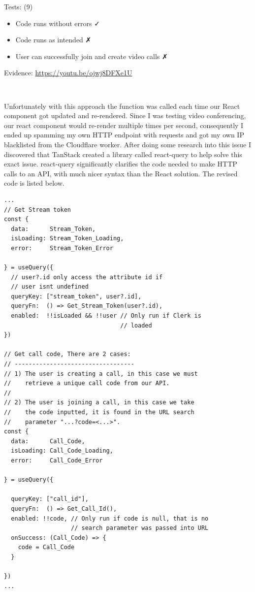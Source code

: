 {\sffamily Tests: (9)}

\begin{itemize}
  \item Code runs without errors \faCheck \\
  \item Code runs as intended \faClose \\
  \item User can successfully join and create video calls \faClose \\
\end{itemize}

{\sffamily Evidence:} \url{https://youtu.be/ojwj8DFXe1U}

{\color{gray} \hrulefill} \\ \vspace{0.2cm}

Unfortunately with this approach the 
function was called each time our React component got updated and
re-rendered. Since I was testing video conferencing, our react
component would re-render multiple times per second, consequently
I ended up spamming my own HTTP endpoint with requests and got
my own IP blacklisted from the Cloudflare worker. After doing
some research into this issue I discovered that TanStack
created a library called react-query to help solve this
exact issue. react-query significantly clarifies the code
needed to make HTTP calls to an API, with much nicer syntax
than the React  solution. The revised code is
listed below.

\begin{verbatim}
...
// Get Stream token
const {
  data:      Stream_Token,
  isLoading: Stream_Token_Loading,
  error:     Stream_Token_Error

} = useQuery({
  // user?.id only access the attribute id if
  // user isnt undefined
  queryKey: ["stream_token", user?.id],
  queryFn:  () => Get_Stream_Token(user?.id),
  enabled:  !!isLoaded && !!user // Only run if Clerk is
                                 // loaded
})

// Get call code, There are 2 cases:
// ----------------------------------
// 1) The user is creating a call, in this case we must
//    retrieve a unique call code from our API.
//
// 2) The user is joining a call, in this case we take
//    the code inputted, it is found in the URL search
//    parameter "...?code=<...>".
const {
  data:      Call_Code,
  isLoading: Call_Code_Loading,
  error:     Call_Code_Error

} = useQuery({

  queryKey: ["call_id"],
  queryFn:  () => Get_Call_Id(),
  enabled: !!code, // Only run if code is null, that is no
                   // search parameter was passed into URL
  onSuccess: (Call_Code) => {
    code = Call_Code
  }

})
...
\end{verbatim}

